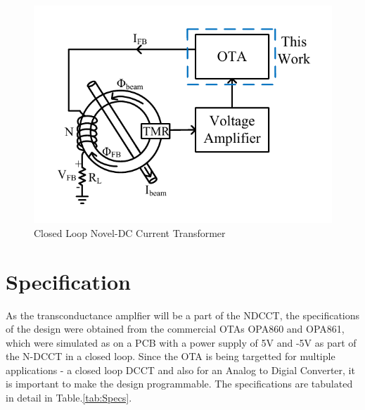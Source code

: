 \begin{figure} [H]
\centering
\includegraphics[scale=1]{Figures/System_Level/HRDCCT.pdf}
\caption{Closed Loop Novel-DC Current Transformer \cite{hrdcct}}
\label{fig:HRDCCT}
\end{figure}

\vfill
\clearpage

\section{Specification}
As the transconductance amplfier will be a part of the NDCCT, the specifications of the design were obtained from the commercial OTAs OPA860 and OPA861, which were simulated as on a PCB with a power supply of 5V and -5V as part of the N-DCCT in a closed loop. Since the OTA is being targetted for multiple applications - a closed loop DCCT and also for an Analog to Digial Converter, it is important to make the design programmable. The specifications are tabulated in detail in Table.\ref{tab:Specs}.

